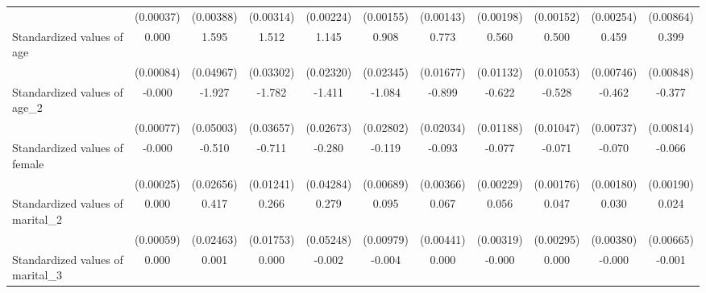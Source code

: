 {\begin{tabular}{l*{10}{c}}
                    &   (0.00037)         &   (0.00388)         &   (0.00314)         &   (0.00224)         &   (0.00155)         &   (0.00143)         &   (0.00198)         &   (0.00152)         &   (0.00254)         &   (0.00864)         \\
Standardized values of age&       0.000         &       1.595\sym{***}&       1.512\sym{***}&       1.145\sym{***}&       0.908\sym{***}&       0.773\sym{***}&       0.560\sym{***}&       0.500\sym{***}&       0.459\sym{***}&       0.399\sym{***}\\
                    &   (0.00084)         &   (0.04967)         &   (0.03302)         &   (0.02320)         &   (0.02345)         &   (0.01677)         &   (0.01132)         &   (0.01053)         &   (0.00746)         &   (0.00848)         \\
Standardized values of age\_2&      -0.000         &      -1.927\sym{***}&      -1.782\sym{***}&      -1.411\sym{***}&      -1.084\sym{***}&      -0.899\sym{***}&      -0.622\sym{***}&      -0.528\sym{***}&      -0.462\sym{***}&      -0.377\sym{***}\\
                    &   (0.00077)         &   (0.05003)         &   (0.03657)         &   (0.02673)         &   (0.02802)         &   (0.02034)         &   (0.01188)         &   (0.01047)         &   (0.00737)         &   (0.00814)         \\
Standardized values of female&      -0.000         &      -0.510\sym{***}&      -0.711\sym{***}&      -0.280\sym{***}&      -0.119\sym{***}&      -0.093\sym{***}&      -0.077\sym{***}&      -0.071\sym{***}&      -0.070\sym{***}&      -0.066\sym{***}\\
                    &   (0.00025)         &   (0.02656)         &   (0.01241)         &   (0.04284)         &   (0.00689)         &   (0.00366)         &   (0.00229)         &   (0.00176)         &   (0.00180)         &   (0.00190)         \\
Standardized values of marital\_2&       0.000         &       0.417\sym{***}&       0.266\sym{***}&       0.279\sym{***}&       0.095\sym{***}&       0.067\sym{***}&       0.056\sym{***}&       0.047\sym{***}&       0.030\sym{***}&       0.024\sym{***}\\
                    &   (0.00059)         &   (0.02463)         &   (0.01753)         &   (0.05248)         &   (0.00979)         &   (0.00441)         &   (0.00319)         &   (0.00295)         &   (0.00380)         &   (0.00665)         \\
Standardized values of marital\_3&       0.000         &       0.001\sym{***}&       0.000\sym{**} &      -0.002\sym{***}&      -0.004\sym{***}&       0.000\sym{*}  &      -0.000         &       0.000         &      -0.000\sym{***}&      -0.001\sym{***}\\

\end{tabular}}
